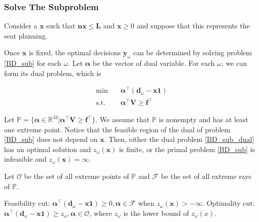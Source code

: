 \subsubsection{Solve The Subproblem}\label{second_stage}
Consider a $\mathbf{x}$ such that $\mathbf{n x} \leq \mathbf{L}$ and $\mathbf{x} \geq 0$ and suppose that this represents the seat planning. 


Once $\mathbf{x}$ is fixed, the optimal decisions $\mathbf{y}_{\omega}$ can be determined by solving problem \eqref{BD_sub} for each $\omega$.  Let $\bm{\alpha}$ be the vector of dual variable. For each $\omega$, we can form its dual problem, which is 

\begin{equation}\label{BD_sub_dual}
  \begin{aligned}
    \min \quad & \bm{\alpha}^{\intercal} (\mathbf{d}_{\omega}- \mathbf{x} \mathbf{1}) \\
    \text {s.t.} \quad & \bm{\alpha}^{\intercal} \mathbf{V} \geq \mathbf{f}^{\intercal}
  \end{aligned}
\end{equation}

Let $\mathbb{P} = \{\bm{\alpha} \in \mathbb{R}^{M}|\bm{\alpha}^{\intercal} \mathbf{V} \geq \mathbf{f}^{\intercal}\}$. We assume that $\mathbb{P}$ is nonempty and has at least one extreme point. Notice that the feasible region of the dual of problem \eqref{BD_sub} does not depend on $\mathbf{x}$. Then, either the dual problem \eqref{BD_sub_dual} has an optimal solution and $z_{\omega}(\mathbf{x})$ is finite, or the primal problem \eqref{BD_sub} is infeasible and $z_{\omega}(\mathbf{x}) = \infty$.  

Let $\mathcal{O}$ be the set of all extreme points of $\mathbb{P}$ and $\mathcal{F}$ be the set of all extreme rays of $\mathbb{P}$. 


\begin{definition}
  Feasibility cut: $\bm{\alpha}^{\intercal}(\mathbf{d}_{\omega}- \mathbf{x} \mathbf{1}) \geq 0, \bm{\alpha} \in \mathcal{F}$ when $z_{\omega}(\mathbf{x}) > -\infty$.
  Optimality cut: $\bm{\alpha}^{\intercal}(\mathbf{d}_{\omega}- \mathbf{x} \mathbf{1}) \geq z_{\omega}, \bm{\alpha} \in \mathcal{O}$, where $z_{\omega}$ is the lower bound of $z_{\omega}(x)$.
\end{definition}

